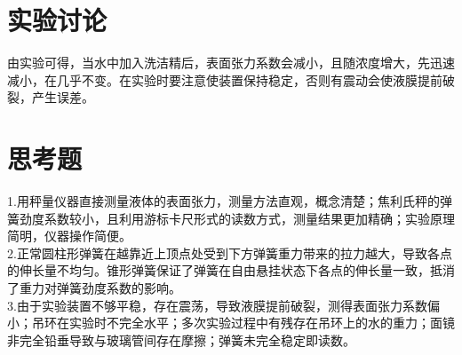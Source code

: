 \documentclass{report}
\begin{document}
	\section{实验讨论}
由实验可得，当水中加入洗洁精后，表面张力系数会减小，且随浓度增大，先迅速减小，在几乎不变。在实验时要注意使装置保持稳定，否则有震动会使液膜提前破裂，产生误差。
	\section{思考题}
1.用秤量仪器直接测量液体的表面张力，测量方法直观，概念清楚；焦利氏秤的弹簧劲度系数较小，且利用游标卡尺形式的读数方式，测量结果更加精确；实验原理简明，仪器操作简便。\\
2.正常圆柱形弹簧在越靠近上顶点处受到下方弹簧重力带来的拉力越大，导致各点的伸长量不均匀。锥形弹簧保证了弹簧在自由悬挂状态下各点的伸长量一致，抵消了重力对弹簧劲度系数的影响。\\
3.由于实验装置不够平稳，存在震荡，导致液膜提前破裂，测得表面张力系数偏小；吊环在实验时不完全水平；多次实验过程中有残存在吊环上的水的重力；面镜非完全铅垂导致与玻璃管间存在摩擦；弹簧未完全稳定即读数。
	
\end{document}
